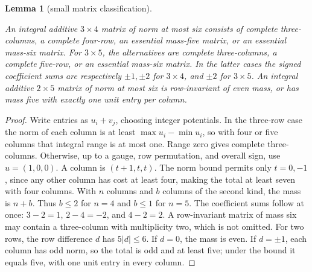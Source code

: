 \documentclass[11pt]{amsart}
\numberwithin{theorem}{section}
\newtheorem{lemma}[theorem]{Lemma}
\theoremstyle{remark}
\numberwithin{equation}{section}
\begin{document}
\begin{lemma}[small matrix classification]\label{lemma:6.1}

An integral additive \(3\times4\) matrix of norm at most six consists of
complete three-columns, a complete four-row, an essential mass-five matrix,
or an essential mass-six matrix. For \(3\times5\), the alternatives are
complete three-columns, a complete five-row, or an essential mass-six
matrix. In the latter cases the signed coefficient sums are respectively
\(\pm1,\pm2\) for \(3\times4\), and \(\pm2\) for \(3\times5\).
An integral additive \(2\times5\) matrix of norm at most six is
row-invariant of even mass, or has mass five with exactly one unit entry
per column.

\end{lemma}
\begin{proof}

Write entries as \(u_i+v_j\), choosing integer potentials. In the
three-row case the norm of each column is at least \(\max u_i-\min u_i\),
so with four or five columns that integral range is at most one. Range
zero gives complete three-columns. Otherwise, up to a gauge, row
permutation, and overall sign, use \(u=(1,0,0)\). A column is
\((t+1,t,t)\). The norm bound permits only \(t=0,-1\), since any other
column has cost at least four, making the total at least seven with four
columns. With \(n\) columns and \(b\) columns of the second kind, the
mass is \(n+b\). Thus \(b\le2\) for \(n=4\) and \(b\le1\) for
\(n=5\). The coefficient sums follow at once: \(3-2=1\),
\(2-4=-2\), and \(4-2=2\). A row-invariant matrix of mass six may
contain a three-column with multiplicity two, which is not omitted.
For two rows, the row difference \(d\) has \(5|d|\le6\). If \(d=0\),
the mass is even. If \(d=\pm1\), each column has odd norm, so the total
is odd and at least five; under the bound it equals five, with one unit
entry in every column.
\end{proof}
\end{document}

